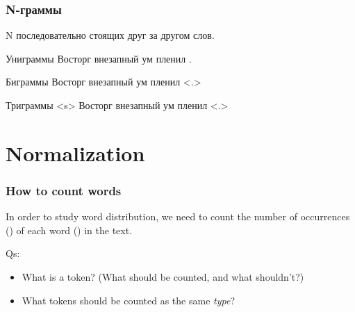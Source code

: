 \documentclass[svgnames]{beamer}
\begin{document}
\begin{frame}

  \frametitle{N-граммы}

  N последовательно стоящих друг за другом слов.

  \begin{block}{Униграммы}
    \alert<2>{Восторг} \alert<3>{внезапный} \alert<4>{ум}
    \alert<5>{пленил} .
  \end{block}

  \begin{block}{Биграммы}
  \alert<2>{Восторг} \alert<2-3>{внезапный} \alert<3-4>{ум}
  \alert<4-5>{пленил} \alert<5>{<.>}
  \end{block}

  \begin{block}{Триграммы}
  \alert<2>{<s>}  \alert<2-3>{Восторг} \alert<2-4>{внезапный}
  \alert<3-5>{ум} \alert<4-5>{пленил} \alert<5>{<.>}
  \end{block}
\end{frame}

\section{Normalization}

\begin{frame}
  \frametitle{How to count words}
  \Large
  In order to study word distribution, we need to count the number of
  occurrences () of each word 
  () in the text. 
  
  \begin{block}{Qs:}
  \begin{itemize}
  \item What is a token? (What should be counted, and what shouldn't?)
  \item What tokens should be counted as the same \textit{type}?
  \end{itemize}
  \end{block}
\end{frame}
\end{document}
